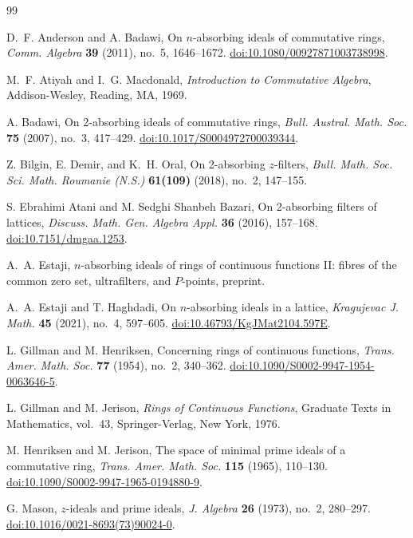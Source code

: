 \documentclass[11pt]{amsart}
\theoremstyle{definition}
\theoremstyle{remark}
\begin{document}
\begin{thebibliography}{99}

D.~F. Anderson and A. Badawi,
On $n$-absorbing ideals of commutative rings,
\emph{Comm. Algebra} \textbf{39} (2011), no.~5, 1646--1672.
\href{https://doi.org/10.1080/00927871003738998}
{doi:10.1080/00927871003738998}.

M.~F. Atiyah and I.~G. Macdonald,
\emph{Introduction to Commutative Algebra},
Addison-Wesley, Reading, MA, 1969.

A. Badawi,
On 2-absorbing ideals of commutative rings,
\emph{Bull. Austral. Math. Soc.} \textbf{75} (2007), no.~3, 417--429.
\href{https://doi.org/10.1017/S0004972700039344}
{doi:10.1017/S0004972700039344}.

Z. Bilgin, E. Demir, and K.~H. Oral,
On 2-absorbing $z$-filters,
\emph{Bull. Math. Soc. Sci. Math. Roumanie (N.S.)}
\textbf{61(109)} (2018), no.~2, 147--155.

S. Ebrahimi Atani and M. Sedghi Shanbeh Bazari,
On 2-absorbing filters of lattices,
\emph{Discuss. Math. Gen. Algebra Appl.}
\textbf{36} (2016), 157--168.
\href{https://doi.org/10.7151/dmgaa.1253}
{doi:10.7151/dmgaa.1253}.

A.~A. Estaji,
$n$-absorbing ideals of rings of continuous functions II:
fibres of the common zero set, ultrafilters, and $P$-points,
preprint.

A.~A. Estaji and T. Haghdadi,
On $n$-absorbing ideals in a lattice,
\emph{Kragujevac J. Math.}
\textbf{45} (2021), no.~4, 597--605.
\href{https://doi.org/10.46793/KgJMat2104.597E}
{doi:10.46793/KgJMat2104.597E}.

L. Gillman and M. Henriksen,
Concerning rings of continuous functions,
\emph{Trans. Amer. Math. Soc.} \textbf{77} (1954), no.~2, 340--362.
\href{https://doi.org/10.1090/S0002-9947-1954-0063646-5}
{doi:10.1090/S0002-9947-1954-0063646-5}.

L. Gillman and M. Jerison,
\emph{Rings of Continuous Functions},
Graduate Texts in Mathematics, vol.~43,
Springer-Verlag, New York, 1976.

M. Henriksen and M. Jerison,
The space of minimal prime ideals of a commutative ring,
\emph{Trans. Amer. Math. Soc.} \textbf{115} (1965), 110--130.
\href{https://doi.org/10.1090/S0002-9947-1965-0194880-9}
{doi:10.1090/S0002-9947-1965-0194880-9}.

G. Mason,
$z$-ideals and prime ideals,
\emph{J. Algebra} \textbf{26} (1973), no.~2, 280--297.
\href{https://doi.org/10.1016/0021-8693(73)90024-0}
{doi:10.1016/0021-8693(73)90024-0}.

\end{thebibliography}
\end{document}
